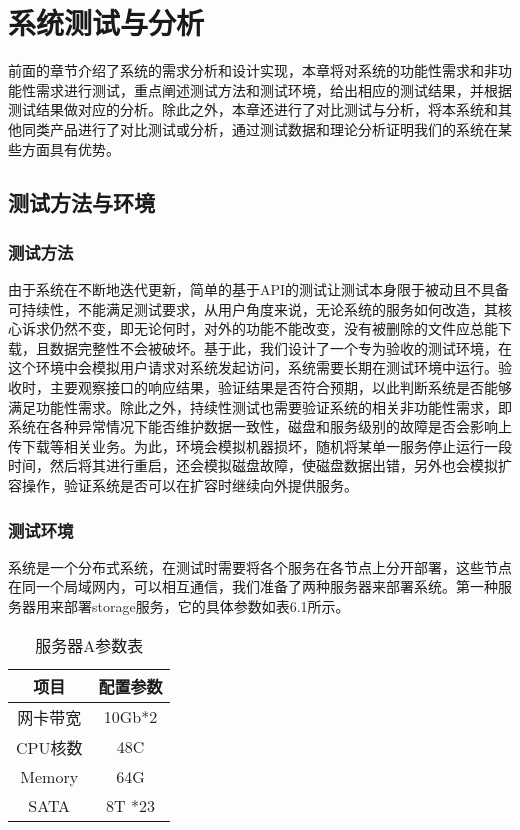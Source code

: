 
\chapter{系统测试与分析}
前面的章节介绍了系统的需求分析和设计实现，本章将对系统的功能性需求和非功能性需求进行测试，重点阐述测试方法和测试环境，给出相应的测试结果，并根据测试结果做对应的分析。除此之外，本章还进行了对比测试与分析，将本系统和其他同类产品进行了对比测试或分析，通过测试数据和理论分析证明我们的系统在某些方面具有优势。

\section{测试方法与环境}%
\subsection{测试方法}%
由于系统在不断地迭代更新，简单的基于API的测试让测试本身限于被动且不具备可持续性，不能满足测试要求，从用户角度来说，无论系统的服务如何改造，其核心诉求仍然不变，即无论何时，对外的功能不能改变，没有被删除的文件应总能下载，且数据完整性不会被破坏。基于此，我们设计了一个专为验收的测试环境，在这个环境中会模拟用户请求对系统发起访问，系统需要长期在测试环境中运行。验收时，主要观察接口的响应结果，验证结果是否符合预期，以此判断系统是否能够满足功能性需求。除此之外，持续性测试也需要验证系统的相关非功能性需求，即系统在各种异常情况下能否维护数据一致性，磁盘和服务级别的故障是否会影响上传下载等相关业务。为此，环境会模拟机器损坏，随机将某单一服务停止运行一段时间，然后将其进行重启，还会模拟磁盘故障，使磁盘数据出错，另外也会模拟扩容操作，验证系统是否可以在扩容时继续向外提供服务。

\subsection{测试环境}%
系统是一个分布式系统，在测试时需要将各个服务在各节点上分开部署，这些节点在同一个局域网内，可以相互通信，我们准备了两种服务器来部署系统。第一种服务器用来部署storage服务，它的具体参数如表6.1所示。

\begin{table}[h]
    \centering
    \caption{服务器A参数表}
    \begin{tabular}{cc}
      \toprule
      项目   & 配置参数   \\
      \midrule
      网卡带宽  & 10Gb*2  \\
      CPU核数   & 48C     \\
      Memory   & 64G      \\
      SATA     & 8T *23   \\
      \bottomrule
    \end{tabular}
\end{table}

